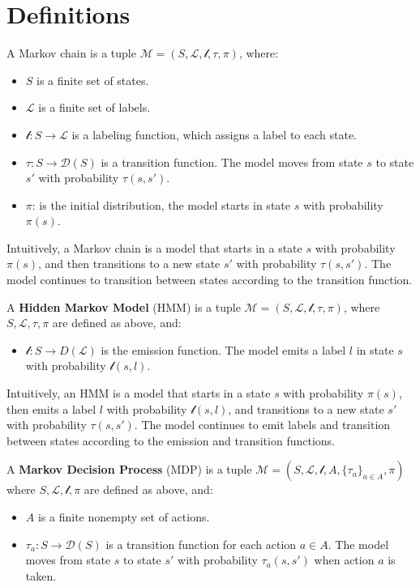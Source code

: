 \section{Definitions}\label{sec:definitions}
\begin{definition}
    A Markov chain is a tuple $\mathcal{M} = (S, \mathcal{L}, \mathcal{l}, \tau, \pi)$, where:
    \begin{itemize}
        \item $S$ is a finite set of states.
        \item $\mathcal{L}$ is a finite set of labels.
        \item $\mathcal{l}: S \rightarrow \mathcal{L}$ is a labeling function, which assigns a label to each state.
        \item $\tau: S \rightarrow \mathcal{D}(S)$ is a transition function. The model moves from state $s$ to state $s'$ with probability $\tau(s, s')$.
        \item $\pi$: is the initial distribution, the model starts in state $s$ with probability $\pi(s)$.
    \end{itemize}
\end{definition}

Intuitively, a Markov chain is a model that starts in a state $s$ with probability $\pi(s)$, and then transitions to a new state $s'$ with probability $\tau(s, s')$. The model continues to transition between states according to the transition function.


\begin{definition}
    A \textbf{Hidden Markov Model} (HMM) is a tuple $\mathcal{M} = (S, \mathcal{L}, \mathcal{l}, \tau,  \pi)$, where $S, \mathcal{L}, \tau, \pi$
    are defined as above, and:
    \begin{itemize}
        \item $\mathcal{l}: S \rightarrow D(\mathcal{L})$ is the emission function. The model emits a label $l$ in state $s$ with probability $\mathcal{l}(s, l)$.  
    \end{itemize}
\end{definition}

Intuitively, an HMM is a model that starts in a state $s$ with probability $\pi(s)$, then emits a label $l$ with probability $\mathcal{l}(s, l)$, and transitions to a new state $s'$ with probability $\tau(s, s')$. The model continues to emit labels and transition between states according to the emission and transition functions.

\begin{definition}
    A \textbf{Markov Decision Process} (MDP) is a tuple $\mathcal{M} = (S, \mathcal{L}, \mathcal{l}, A, \{\tau_a\}_{a \in A}, \pi)$ where $S, \mathcal{L}, \mathcal{l}, \pi$ are defined as above, and:
    \begin{itemize}
        \item $A$ is a finite nonempty set of actions.
        \item $\tau_a: S \rightarrow \mathcal{D}(S)$ is a transition function for each action $a \in A$. The model moves from state $s$ to state $s'$ with probability $\tau_a(s, s')$ when action $a$ is taken.
    \end{itemize}
\end{definition}

